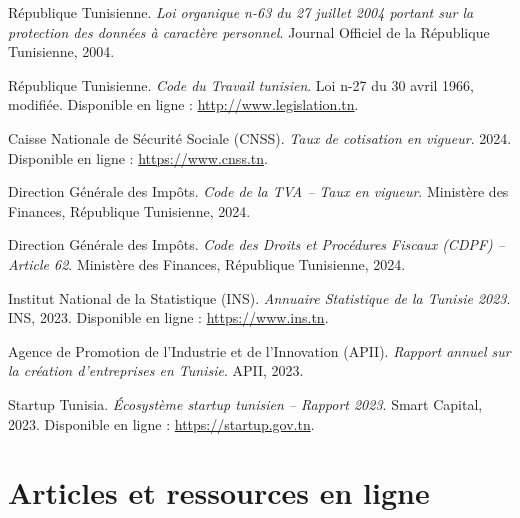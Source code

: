 \begin{enumerate}[label={[\arabic*]}, resume]

\item République Tunisienne. \textit{Loi organique n-63 du 27 juillet 2004 portant sur la protection des données à caractère personnel}. Journal Officiel de la République Tunisienne, 2004.

\item République Tunisienne. \textit{Code du Travail tunisien}. Loi n-27 du 30 avril 1966, modifiée. Disponible en ligne : \url{http://www.legislation.tn}.

\item Caisse Nationale de Sécurité Sociale (CNSS). \textit{Taux de cotisation en vigueur}. 2024. Disponible en ligne : \url{https://www.cnss.tn}.

\item Direction Générale des Impôts. \textit{Code de la TVA -- Taux en vigueur}. Ministère des Finances, République Tunisienne, 2024.

\item Direction Générale des Impôts. \textit{Code des Droits et Procédures Fiscaux (CDPF) -- Article 62}. Ministère des Finances, République Tunisienne, 2024.

\item Institut National de la Statistique (INS). \textit{Annuaire Statistique de la Tunisie 2023}. INS, 2023. Disponible en ligne : \url{https://www.ins.tn}.

\item Agence de Promotion de l'Industrie et de l'Innovation (APII). \textit{Rapport annuel sur la création d'entreprises en Tunisie}. APII, 2023.

\item Startup Tunisia. \textit{Écosystème startup tunisien -- Rapport 2023}. Smart Capital, 2023. Disponible en ligne : \url{https://startup.gov.tn}.

\end{enumerate}

\section*{Articles et ressources en ligne}

